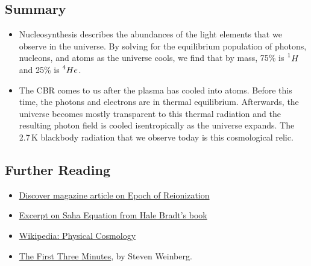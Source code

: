 \subsection{Summary}
\begin{itemize}
\item Nucleosynthesis describes the abundances of the light elements 
	that we observe in the universe. By solving for the equilibrium
	population of photons, nucleons, and atoms as the universe cools,
	we find that by mass, 75\% is $\prescript{1}{}H$ 
	and 25\% is $\prescript{4}{}He$.

\item The CBR comes to us after the plasma has cooled into atoms. 
	Before this time, the photons and electrons are in thermal 
	equilibrium. Afterwards, the universe becomes mostly transparent 
	to this thermal radiation and the resulting photon field is 
	cooled isentropically as the universe expands. The 2.7\,K 
	blackbody radiation that we observe today is this cosmological relic.
\end{itemize}

\subsection{Further Reading}
\begin{itemize}
\item \href{http://discovermagazine.com/2014/april/12-first-light}{Discover magazine article on Epoch of Reionization}
\item \href{http://www.cambridge.org/resources/0521846560/7706_Saha%20equation.pdf}{Excerpt on Saha Equation from Hale Bradt's book}
\item \href{http://en.wikipedia.org/wiki/Physical_cosmology}{Wikipedia: Physical Cosmology}
\item \href{http://www.goodreads.com/book/show/150131.The_First_Three_Minutes}{The First Three Minutes}, by Steven Weinberg.
\end{itemize}

